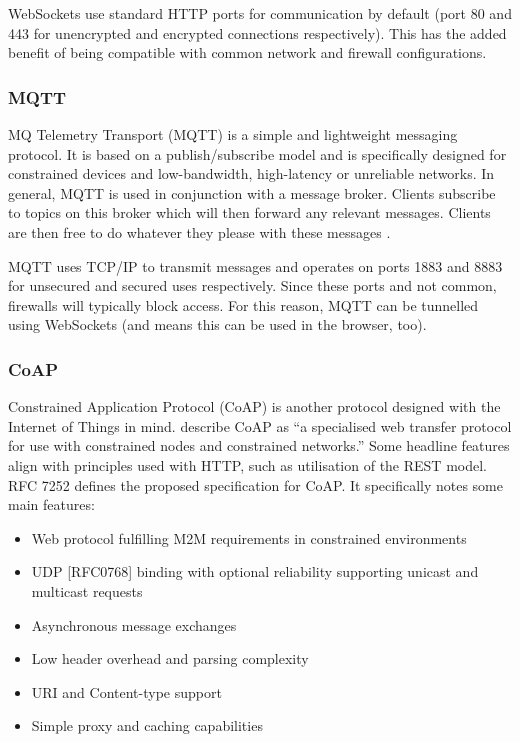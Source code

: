         WebSockets use standard HTTP ports for communication by default (port 80 and 443 for unencrypted and encrypted connections respectively). This has the added benefit of being compatible with common network and firewall configurations.

      \subsubsection{MQTT}
        MQ Telemetry Transport (MQTT) is a simple and lightweight messaging protocol. It is based on a publish/subscribe model and is specifically designed for constrained devices and low-bandwidth, high-latency or unreliable networks. In general, MQTT is used in conjunction with a message broker. Clients subscribe to topics on this broker which will then forward any relevant messages. Clients are then free to do whatever they please with these messages \citep{mqtt:2015}.

        MQTT uses TCP/IP to transmit messages and operates on ports 1883 and 8883 for unsecured and secured uses respectively. Since these ports and not common, firewalls will typically block access. For this reason, MQTT can be tunnelled using WebSockets (and means this can be used in the browser, too).

      \subsubsection{CoAP}
        Constrained Application Protocol (CoAP) is another protocol designed with the Internet of Things in mind. \citet{rfc7252} describe CoAP as ``a specialised web transfer protocol for use with constrained nodes and constrained networks.'' Some headline features align with principles used with HTTP, such as utilisation of the REST model. RFC 7252 defines the proposed specification for CoAP. It specifically notes some main features:

        \begin{itemize}
          \item Web protocol fulfilling M2M requirements in constrained environments
          \item UDP [RFC0768] binding with optional reliability supporting unicast and multicast requests
          \item Asynchronous message exchanges
          \item Low header overhead and parsing complexity
          \item URI and Content-type support
          \item Simple proxy and caching capabilities
        \end{itemize}

